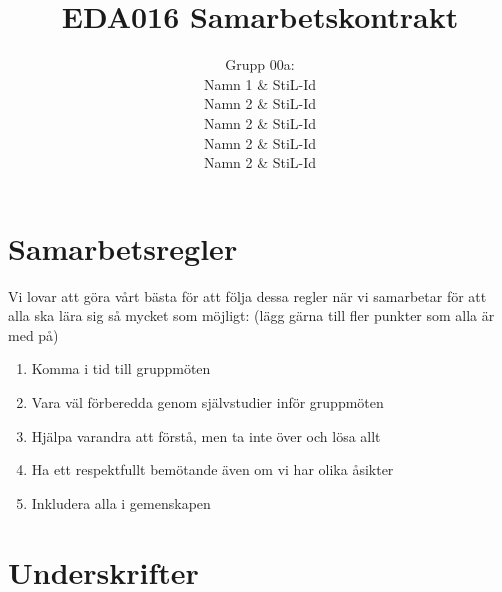 \documentclass[12pt]{article} %
\title{EDA016 Samarbetskontrakt}
\author{Grupp 00a: \\ 
Namn 1 \& StiL-Id \\ 
Namn 2 \& StiL-Id \\ 
Namn 2 \& StiL-Id \\ 
Namn 2 \& StiL-Id \\ 
Namn 2 \& StiL-Id \\ 
}
\begin{document}
\maketitle

\section{Samarbetsregler}
Vi lovar att göra vårt bästa för att följa dessa regler när vi samarbetar för att alla ska lära sig så mycket som möjligt: (lägg gärna till fler punkter som alla är med på)
\begin{enumerate}
\item Komma i tid till gruppmöten
\item Vara väl förberedda genom självstudier inför gruppmöten
\item Hjälpa varandra att förstå, men ta inte över och lösa allt
\item Ha ett respektfullt bemötande även om vi har olika åsikter
\item Inkludera alla i gemenskapen
\end{enumerate}

\section{Underskrifter}
\end{document}
